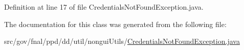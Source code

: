Definition at line 17 of file Credentials\-Not\-Found\-Exception.\-java.



The documentation for this class was generated from the following file\-:\begin{DoxyCompactItemize}
\item 
src/gov/fnal/ppd/dd/util/nongui\-Utils/\hyperlink{CredentialsNotFoundException_8java}{Credentials\-Not\-Found\-Exception.\-java}\end{DoxyCompactItemize}
